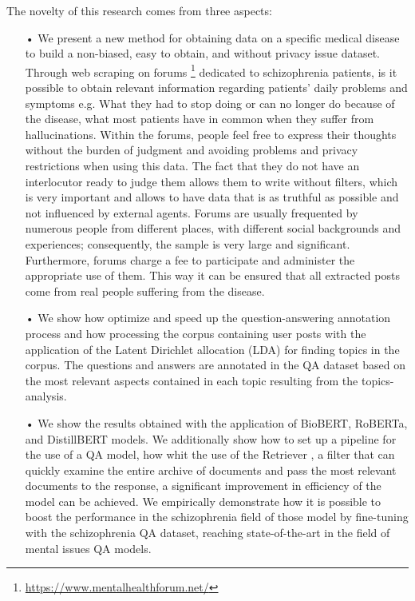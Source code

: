 \documentclass[runningheads]{llncs}
\begin{document}
The novelty of this research comes from three aspects:
\begin{itemize}
    \item[•] We present a new method for obtaining data on a specific medical disease to build a non-biased, easy to obtain, and without privacy issue dataset. Through web scraping on forums \footnote{\url{https://www.mentalhealthforum.net/}} dedicated to schizophrenia patients, is it possible to obtain relevant information regarding patients' daily problems and symptoms e.g. What they had to stop doing or can no longer do because of the disease, what most patients have in common when they suffer from hallucinations. Within the forums, people feel free to express their thoughts without the burden of judgment and avoiding problems and privacy restrictions when using this data. The fact that they do not have an interlocutor ready to judge them allows them to write without filters, which is very important and allows to have data that is as truthful as possible and not influenced by external agents. Forums are usually frequented by numerous people from different places, with different social backgrounds and experiences; consequently, the sample is very large and significant. Furthermore, forums charge a fee to participate and administer the appropriate use of them. This way it can be ensured that all extracted posts come from real people suffering from the disease.
    \item[•] We show how optimize and speed up the question-answering annotation process and how processing the corpus containing user posts with the application of the Latent Dirichlet allocation (LDA) for finding topics in the corpus. The questions and answers are annotated in the QA dataset based on the most relevant aspects contained in each topic resulting from the topics-analysis.
    \item[•] We show the results obtained with the application of BioBERT, RoBERTa, and DistillBERT models. We additionally show how to set up a pipeline for the use of a QA model, how whit the use of the Retriever \cite{c7}, a filter that can quickly examine the entire archive of documents and pass the most relevant documents to the response, a significant improvement in efficiency of the model can be achieved. We empirically demonstrate  how it is possible to boost the performance in the schizophrenia field of those model by fine-tuning with the  schizophrenia QA dataset, reaching state-of-the-art in the field of mental issues QA models.
\end{itemize}
\end{document}
